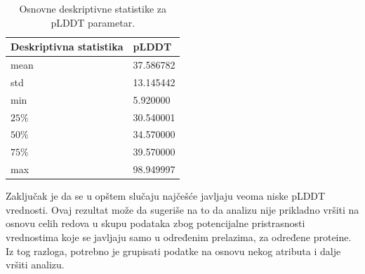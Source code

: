 \documentclass[a4paper,12pt]{article}
\begin{document}
\begin{table}[h!]
    \centering
    \begin{tabular}{ |l|l| } 
    \hline
    \textbf{Deskriptivna statistika} & \textbf{pLDDT} \\
    \hline
    mean & 37.586782 \\
    std  & 13.145442 \\
    min  & 5.920000 \\
    $25\%$  & 30.540001 \\
    $50\%$   & 34.570000 	\\
    $75\%$ & 39.570000 	 \\
    max & 98.949997 	\\
    \hline
    \end{tabular}
    \caption{Osnovne deskriptivne statistike za pLDDT parametar.}
    \label{Tabela:4}
\end{table}
\newpage
Zaključak je da se u opštem slučaju najčešće javljaju veoma niske pLDDT vrednosti. Ovaj rezultat može da sugeriše na to da analizu nije prikladno vršiti na osnovu celih redova u skupu podataka zbog potencijalne pristrasnosti vrednostima koje se javljaju samo u određenim prelazima, za određene proteine. Iz tog razloga, potrebno je grupisati podatke na osnovu nekog atributa i dalje vršiti analizu.
\end{document}
